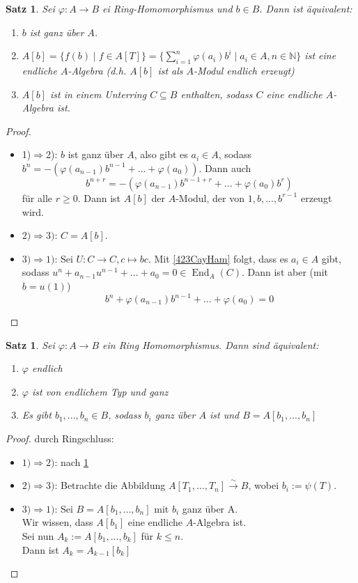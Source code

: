 \documentclass[10pt,a4paper]{article}
\newcommand{\N}{\ensuremath{\mathbb{N}}}
\newcommand{\isomfunc}{\ensuremath{\xrightarrow{\sim}}}
\newcommand{\End}{\operatorname{End}}
\newcounter{thm}[section]
\theoremstyle{definition}
\theoremstyle{plain}
\newtheorem{satz}[thm]{Satz}
\theoremstyle{remark}
\begin{document}
\begin{satz}\label{604Satz}
	Sei $\varphi:A\rightarrow B$ ei Ring-Homomorphismus und $b\in B$. Dann ist äquivalent:
	\begin{enumerate}
		\item $b$ ist ganz über $A$.
		\item $A[b]=\{f(b)\mid f\in A[T]\}=\{\sum_{i=1}^{n}\varphi(a_i)b^i\mid a_i\in A,n\in\N \}$ ist eine endliche $A$-Algebra (d.h. $A[b]$ ist als $A$-Modul endlich erzeugt)
		\item $A[b]$ ist in einem Unterring $C\subseteq B$ enthalten, sodass $C$ eine endliche $A$-Algebra ist.
	\end{enumerate}
\end{satz}
\begin{proof}
	\begin{itemize}
		\item 1)$\Rightarrow$2): $b$ ist ganz über $A$, also gibt es $a_i\in A$, sodass $b^n=-(\varphi(a_{n-1})b^{n-1}+...+\varphi(a_0))$. Dann auch
		\[b^{n+r}=-(\varphi(a_{n-1})b^{n-1+r}+...+\varphi(a_0)b^r)\]
		für alle $r\ge 0$. Dann ist $A[b]$ der $A$-Modul, der von $1,b,...,b^{r-1}$ erzeugt wird.
		\item $2)\Rightarrow3)$: $C=A[b]$.
		\item $3)\Rightarrow1)$: Sei $U:C\rightarrow C,c\mapsto bc$. Mit \ref{423CayHam} folgt, dass es $a_i\in A$ gibt, sodass $u^n+a_{n-1}u^{n-1}+...+a_0=0\in\End_A(C)$. Dann ist aber (mit $b=u(1)$)
		\[b^n+\varphi(a_{n-1})b^{n-1}+...+\varphi(a_0)=0\]
	\end{itemize}
\end{proof}

\begin{satz}\label{605Satz}
	Sei $\varphi:A\rightarrow B$ ein Ring Homomorphismus. Dann sind äquivalent:
	\begin{enumerate}
		\item $\varphi$ endlich
		\item $\varphi$ ist von endlichem Typ und ganz
		\item Es gibt $b_1,...,b_n\in B$, sodass $b_i$ ganz über $A$ ist und $B=A[b_1,...,b_n]$
	\end{enumerate}
\end{satz}
\begin{proof} durch Ringschluss:
	\begin{itemize}
		\item $1)\Rightarrow 2)$: nach \ref{604Satz}
		\item $2)\Rightarrow 3)$: Betrachte die Abbildung $A[T_1,...,T_n]\isomfunc B$, wobei $b_i:=\psi(T)$.
		\item $3)\Rightarrow 1)$: Sei $B=A[b_1,...,b_n]$ mit $b_i$ ganz über A.\\
		Wir wissen, dass $A[b_1]$ eine endliche $A$-Algebra ist.\\
		Sei nun $A_k:=A[b_1,...,b_k]$ für $k\leq n$.\\
		Dann ist $A_k=A_{k-1}[b_k]$ 
	\end{itemize}
\end{proof}
\end{document}
